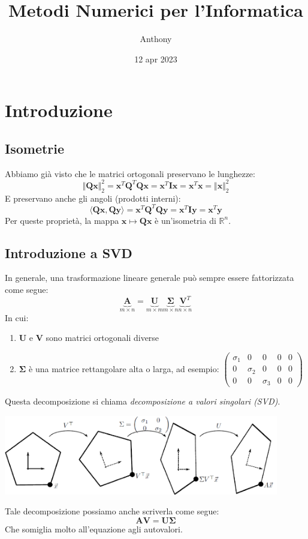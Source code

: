 \documentclass{article}
\title{Metodi Numerici per l'Informatica}
\author{Anthony}
\date{12 apr 2023}
\begin{document}
    \maketitle
    \section{Introduzione}
        \subsection{Isometrie}
            Abbiamo già visto che le matrici ortogonali preservano le lunghezze:
            \[ \Vert \mathbf{Qx} \Vert_2^2 = \mathbf{x}^T\mathbf{Q}^T\mathbf{Qx} = \mathbf{x}^T\mathbf{Ix} = \mathbf{x}^T\mathbf{x} = \Vert \mathbf{x} \Vert_2^2 \]
            E preservano anche gli angoli (prodotti interni):
            \[\langle \mathbf{Qx} , \mathbf{Qy} \rangle = \mathbf{x}^T\mathbf{Q}^T\mathbf{Qy} = \mathbf{x}^T\mathbf{Iy} = \mathbf{x}^T\mathbf{y}\]
            Per queste proprietà, la mappa $\mathbf{x} \mapsto \mathbf{Qx}$ è un'isometria di $\mathbb{R}^n$.
        \subsection{Introduzione a SVD}
            In generale, una trasformazione lineare generale può sempre essere fattorizzata come segue:
            \[ \underbrace{\mathbf{A}}_{m \times n} = \underbrace{\mathbf{U}}_{m \times m} \underbrace{\mathbf{\Sigma}}_{m \times n} \underbrace{\mathbf{V}^T}_{n \times n}\]
            In cui:
            \begin{enumerate}
                \item $\mathbf{U}$ e $\mathbf{V}$ sono matrici ortogonali diverse
                \item $\mathbf{\Sigma}$ è una matrice rettangolare alta o larga, ad esempio: \footnotesize{$\begin{pmatrix}
                    \sigma_1 & 0 & 0 & 0 & 0 \\
                    0 & \sigma_2 & 0 & 0 & 0 \\
                    0 & 0 & \sigma_3 & 0 & 0
                \end{pmatrix}$}
            \end{enumerate}
            Questa decomposizione si chiama \emph{decomposizione a valori singolari (SVD)}.
            \begin{center}\includegraphics[width=12cm]{singular_val.png}\end{center}
            Tale decomposizione possiamo anche scriverla come segue:
            \[\mathbf{AV} = \mathbf{U\Sigma}\]
            Che somiglia molto all'equazione agli autovalori.
\end{document}
